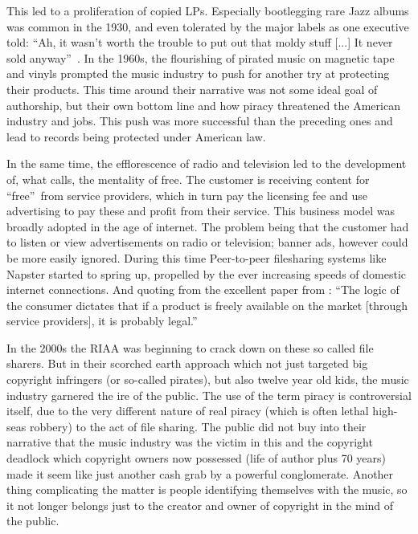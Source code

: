 \documentclass[a4paper]{report}
\begin{document}
This led to a proliferation of copied LPs. Especially bootlegging rare Jazz albums was common in the 1930, and even tolerated by the major labels as one executive told: \textquotedblleft Ah, it wasn't worth the trouble to put out that moldy stuff [...] It never sold anyway\textquotedblright\ \parencite{Cummings2017}.
In the 1960s, the flourishing of pirated music on magnetic tape and vinyls prompted the music industry to push for another try at protecting their products. This time around their narrative was not some ideal goal of authorship, but their own bottom line and how piracy threatened the American industry and jobs. This push was more successful than the preceding ones and lead to records being protected under American law.

In the same time, the efflorescence of radio and television led to the development of, what \cite{Lin2013} calls, the mentality of free. The customer is receiving content for \textquotedblleft free\textquotedblright\ from service providers, which in turn pay the licensing fee and use advertising to pay these and profit from their service. This business model was broadly adopted in the age of internet. The problem being that the customer had to listen or view advertisements on radio or television; banner ads, however could be more easily ignored. During this time Peer-to-peer filesharing systems like Napster started to spring up, propelled by the ever increasing speeds of domestic internet connections. And quoting from the excellent paper from \cite{Lunceford2008}: \textquotedblleft The logic of the consumer dictates that if a product is freely available on the market [through service providers], it is probably  legal.\textquotedblright

In the 2000s the RIAA was beginning to crack down on these so called file sharers. But in their scorched earth approach which not just targeted big copyright infringers (or so-called pirates), but also twelve year old kids, the music industry garnered the ire of the public. The use of the term piracy is controversial itself, due to the very different nature of real piracy (which is often lethal high-seas robbery) to the act of file sharing. The public did not buy into their narrative that the music industry was the victim in this and the copyright deadlock which copyright owners now possessed (life of author plus 70 years) made it seem like just another cash grab by a powerful conglomerate. Another thing complicating the matter is people identifying themselves with the music, so it not longer belongs just to the creator and owner of copyright in the mind of the public. \parencite{Lunceford2008}
\end{document}

